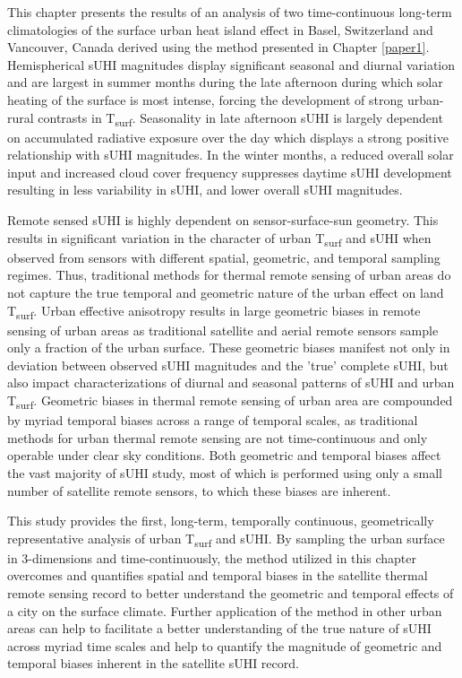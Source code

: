 \begin{bibunit}
This chapter presents the results of an analysis of two time-continuous long-term climatologies of the surface urban heat island effect in Basel, Switzerland and Vancouver, Canada derived using the method presented in Chapter \ref{paper1}. Hemispherical sUHI magnitudes display significant seasonal and diurnal variation and are largest in summer months during the late afternoon during which solar heating of the surface is most intense, forcing the development of strong urban-rural contrasts in T\textsubscript{surf}. Seasonality in late afternoon sUHI is largely dependent on accumulated radiative exposure over the day which displays a strong positive relationship with sUHI magnitudes. In the winter months, a reduced overall solar input and increased cloud cover frequency suppresses daytime sUHI development resulting in less variability in sUHI, and lower overall sUHI magnitudes. 

Remote sensed sUHI is highly dependent on sensor-surface-sun geometry. This results in significant variation in the character of urban T\textsubscript{surf} and sUHI when observed from sensors with different spatial, geometric, and temporal sampling regimes. Thus, traditional methods for thermal remote sensing of urban areas do not capture the true temporal and geometric nature of the urban effect on land T\textsubscript{surf}. Urban effective anisotropy results in large geometric biases in remote sensing of urban areas as traditional satellite and aerial remote sensors sample only a fraction of the urban surface. These geometric biases manifest not only in deviation between observed sUHI magnitudes and the 'true' complete sUHI, but also impact characterizations of diurnal and seasonal patterns of sUHI and urban T\textsubscript{surf}. Geometric biases in thermal remote sensing of urban area are compounded by myriad temporal biases across a range of temporal scales, as traditional methods for urban thermal remote sensing are not time-continuous and only operable under clear sky conditions. Both geometric and temporal biases affect the vast majority of sUHI study, most of which is performed using only a small number of satellite remote sensors, to which these biases are inherent.

This study provides the first, long-term, temporally continuous, geometrically representative analysis of urban T\textsubscript{surf} and sUHI. By sampling the urban surface in 3-dimensions and time-continuously, the method utilized in this chapter overcomes and quantifies spatial and temporal biases in the satellite thermal remote sensing record to better understand the geometric and temporal effects of a city on the surface climate. Further application of the method in other urban areas can help to facilitate a better understanding of the true nature of sUHI across myriad time scales and help to quantify the magnitude of geometric and temporal biases inherent in the satellite sUHI record.

\cleardoublepage 
{}  
\renewcommand*{\bibname}{References}


\putbib
\end{bibunit}